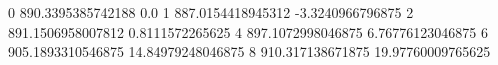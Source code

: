 0 890.3395385742188 0.0
1 887.0154418945312 -3.3240966796875
2 891.1506958007812 0.8111572265625
4 897.1072998046875 6.76776123046875
6 905.1893310546875 14.84979248046875
8 910.317138671875 19.97760009765625
